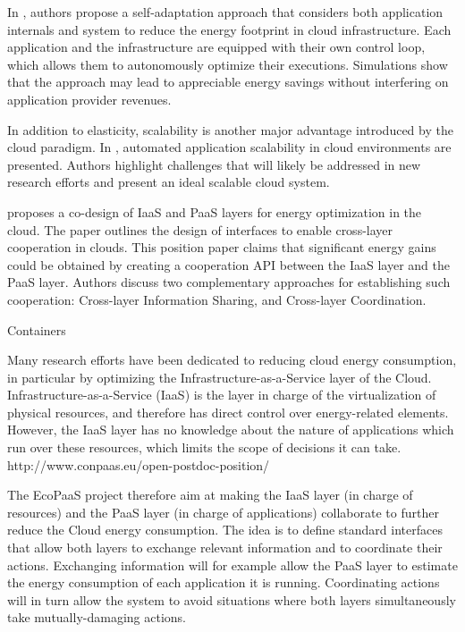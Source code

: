 In \cite{de_oliveira_self-management_2012}, authors propose a self-adaptation approach that considers both application internals and system to reduce the energy footprint in cloud infrastructure. Each application and the infrastructure are equipped with their own control loop, which allows them to autonomously optimize their executions. Simulations show that the approach may lead to appreciable energy savings without interfering on application provider revenues.

In addition to elasticity, scalability is another major advantage introduced by the cloud paradigm. In \cite{vaquero_dynamically_2011}, automated application scalability in cloud environments are presented. Authors highlight challenges that will likely be addressed in new research efforts and present an ideal scalable cloud system.


\cite{carpen-amarie_towards_2014} proposes a co-design of IaaS and PaaS layers for energy optimization in the cloud. The paper outlines the design of interfaces to enable cross-layer cooperation in clouds. This position paper claims that significant energy gains could be obtained by creating a cooperation API between the IaaS layer and the PaaS layer. Authors discuss two complementary approaches for establishing such cooperation: Cross-layer Information Sharing, and Cross-layer Coordination.

Containers




Many research efforts have been dedicated to reducing cloud energy consumption, in particular by optimizing the Infrastructure-as-a-Service layer of the Cloud. Infrastructure-as-a-Service (IaaS) is the layer in charge of the virtualization of physical resources, and therefore has direct control over energy-related elements. However, the IaaS layer has no knowledge about the nature of applications which run over these resources, which limits the scope of decisions it can take.
http://www.conpaas.eu/open-postdoc-position/

The EcoPaaS project therefore aim at making the IaaS layer (in charge of resources) and the PaaS layer (in charge of applications) collaborate to further reduce the Cloud energy consumption. The idea is to define standard interfaces that allow both layers to exchange relevant information and to coordinate their actions. Exchanging information will for example allow the PaaS layer to estimate the energy consumption of each application it is running. Coordinating actions will in turn allow the system to avoid situations where both layers simultaneously take mutually-damaging actions.


